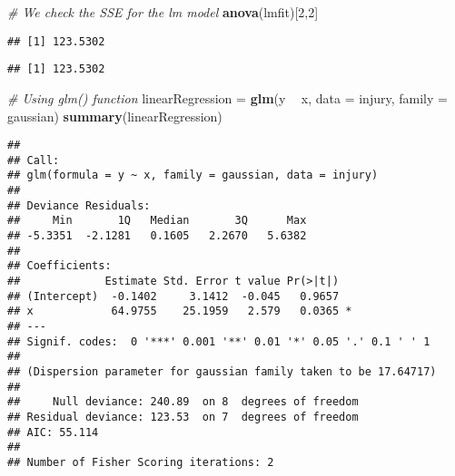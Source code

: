 \documentclass[]{article}
\newenvironment{Shaded}{\begin{snugshade}}{\end{snugshade}}
\newcommand{\CommentTok}[1]{\textcolor[rgb]{0.56,0.35,0.01}{\textit{#1}}}
\newcommand{\DataTypeTok}[1]{\textcolor[rgb]{0.13,0.29,0.53}{#1}}
\newcommand{\DecValTok}[1]{\textcolor[rgb]{0.00,0.00,0.81}{#1}}
\newcommand{\KeywordTok}[1]{\textcolor[rgb]{0.13,0.29,0.53}{\textbf{#1}}}
\newcommand{\NormalTok}[1]{#1}
\newcommand{\OperatorTok}[1]{\textcolor[rgb]{0.81,0.36,0.00}{\textbf{#1}}}
\newcommand{\StringTok}[1]{\textcolor[rgb]{0.31,0.60,0.02}{#1}}
\begin{document}
\begin{Shaded}
\begin{Highlighting}[]
\CommentTok{# We check the SSE for the lm model}
\KeywordTok{anova}\NormalTok{(lmfit)[}\DecValTok{2}\NormalTok{,}\DecValTok{2}\NormalTok{]}
\end{Highlighting}
\end{Shaded}

\begin{verbatim}
## [1] 123.5302
\end{verbatim}

\begin{Shaded}
\end{Shaded}

\begin{verbatim}
## [1] 123.5302
\end{verbatim}

\begin{Shaded}
\begin{Highlighting}[]
\CommentTok{# Using glm() function}
\NormalTok{linearRegression =}\StringTok{ }\KeywordTok{glm}\NormalTok{(y }\OperatorTok{~}\StringTok{ }\NormalTok{x, }\DataTypeTok{data =}\NormalTok{ injury, }\DataTypeTok{family =}\NormalTok{ gaussian)}
\KeywordTok{summary}\NormalTok{(linearRegression)}
\end{Highlighting}
\end{Shaded}

\begin{verbatim}
## 
## Call:
## glm(formula = y ~ x, family = gaussian, data = injury)
## 
## Deviance Residuals: 
##     Min       1Q   Median       3Q      Max  
## -5.3351  -2.1281   0.1605   2.2670   5.6382  
## 
## Coefficients:
##             Estimate Std. Error t value Pr(>|t|)  
## (Intercept)  -0.1402     3.1412  -0.045   0.9657  
## x            64.9755    25.1959   2.579   0.0365 *
## ---
## Signif. codes:  0 '***' 0.001 '**' 0.01 '*' 0.05 '.' 0.1 ' ' 1
## 
## (Dispersion parameter for gaussian family taken to be 17.64717)
## 
##     Null deviance: 240.89  on 8  degrees of freedom
## Residual deviance: 123.53  on 7  degrees of freedom
## AIC: 55.114
## 
## Number of Fisher Scoring iterations: 2
\end{verbatim}

\begin{Shaded}
\end{Shaded}
\end{document}
